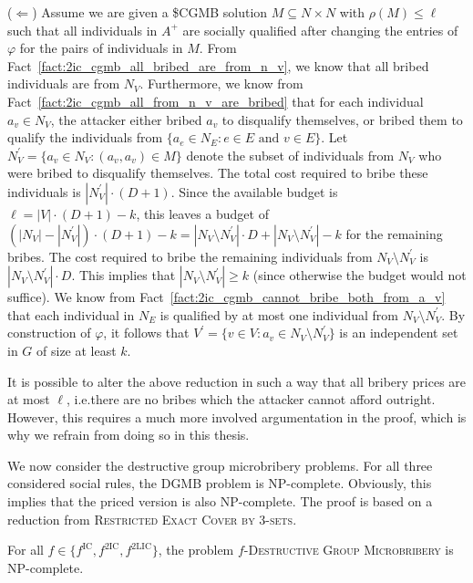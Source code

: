 \documentclass[
    12pt,               %
    a4paper,            %
    bibtotoc,           %
    pointlessnumbers,   %
    ngerman,            %
    titlepage,          %
    leqno,              %
    ]{scrarticle}       %
\newcommand\factref{Fact~\ref}
\begin{document}
\begin{Proof}
($\Leftarrow$) Assume we are given a \$CGMB solution $M \subseteq N \times N$ with $\rho(M) \leq \ell$ such that all individuals in $A^+$ are socially qualified after changing the entries of $\varphi$ for the pairs of individuals in $M$. From \factref{fact:2ic_cgmb_all_bribed_are_from_n_v}, we know that all bribed individuals are from $N_V$. Furthermore, we know from \factref{fact:2ic_cgmb_all_from_n_v_are_bribed} that for each individual $a_v \in N_V$, the attacker either bribed $a_v$ to disqualify themselves, or bribed them to qualify the individuals from $\{ a_e \in N_E : e \in E \text{ and } v \in E \}$. Let $N_V^\prime = \{ a_v \in N_V : (a_v, a_v) \in M \}$ denote the subset of individuals from $N_V$ who were bribed to disqualify themselves. The total cost required to bribe these individuals is $|N_V^\prime| \cdot (D + 1)$. Since the available budget is $\ell = |V| \cdot (D + 1) - k$, this leaves a budget of $(|N_V| - |N_V^\prime|) \cdot (D + 1) - k = |N_V \setminus N_V^\prime| \cdot D + |N_V \setminus N_V^\prime| - k$ for the remaining bribes. The cost required to bribe the remaining individuals from $N_V \setminus N_V^\prime$ is $|N_V \setminus N_V^\prime| \cdot D$. This implies that $|N_V \setminus N_V^\prime| \geq k$ (since otherwise the budget would not suffice). We know from \factref{fact:2ic_cgmb_cannot_bribe_both_from_a_v} that each individual in $N_E$ is qualified by at most one individual from $N_V \setminus N_V^\prime$. By construction of $\varphi$, it follows that $V^\prime = \{ v \in V : a_v \in N_V \setminus N_V^\prime \}$ is an independent set in $G$ of size at least $k$.
\end{Proof}



It is possible to alter the above reduction in such a way that all bribery prices are at most $\ell$, i.e.\@ there are no bribes which the attacker cannot afford outright. However, this requires a much more involved argumentation in the proof, which is why we refrain from doing so in this thesis.



We now consider the destructive group microbribery problems. For all three considered social rules, the DGMB problem is NP-complete. Obviously, this implies that the priced version is also NP-complete. The proof is based on a reduction from \textsc{Restricted Exact Cover by 3-sets}.

\begin{Theorem} \label{thm:ic_dgmb_npc}
For all $f \in \{ f^{\text{IC}}, f^{\text{2IC}}, f^{\text{2LIC}} \}$, the problem $f$-\textsc{Destructive Group Microbribery} is NP-complete.
\end{Theorem}
\end{document}
